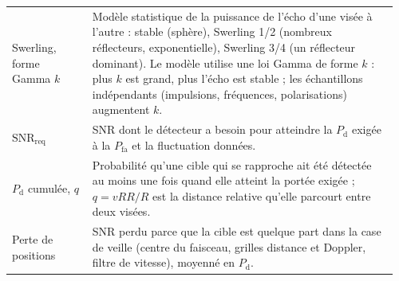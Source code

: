 \documentclass[11pt,a4paper]{article}
\newcommand{\SNR}{\mathrm{SNR}}
\newcommand{\Pd}{P_{\mathrm d}}
\newcommand{\Pfa}{P_{\mathrm{fa}}}
\begin{document}
{\begin{longtable}{@{}p{0.2\linewidth}p{0.76\linewidth}@{}}
Swerling, forme Gamma $k$ & Modèle statistique de la puissance de l'écho d'une visée à l'autre : stable (sphère),
Swerling 1/2 (nombreux réflecteurs, exponentielle), Swerling 3/4 (un réflecteur dominant). Le modèle utilise une loi
Gamma de forme $k$ : plus $k$ est grand, plus l'écho est stable ; les échantillons indépendants (impulsions,
fréquences, polarisations) augmentent $k$.\\
$\SNR_{\mathrm{req}}$ & SNR dont le détecteur a besoin pour atteindre la $\Pd$ exigée à la $\Pfa$ et la fluctuation
données.\\
$\Pd$ cumulée, $q$ & Probabilité qu'une cible qui se rapproche ait été détectée au moins une fois quand elle atteint la
portée exigée ; $q = vRR/R$ est la distance relative qu'elle parcourt entre deux visées.\\
Perte de positions & SNR perdu parce que la cible est quelque part dans la case de veille (centre du faisceau, grilles
distance et Doppler, filtre de vitesse), moyenné en $\Pd$.\\
\bottomrule
\end{longtable}}
\end{document}
